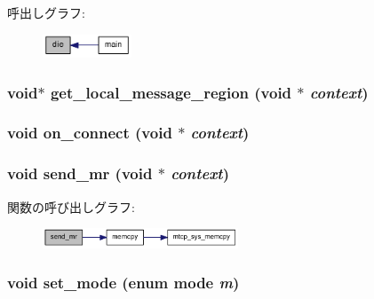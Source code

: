 呼出しグラフ:\nopagebreak
\begin{figure}[H]
\begin{center}
\leavevmode
\includegraphics[width=75pt]{rdma-common_8h_aac69fbddfabaad6d61082ad9e6f94505_icgraph}
\end{center}
\end{figure}
\hypertarget{rdma-common_8h_a0162804c064e82d210197b0163278f39}{
\subsubsection[{get\_\-local\_\-message\_\-region}]{\setlength{\rightskip}{0pt plus 5cm}void$\ast$ get\_\-local\_\-message\_\-region (void $\ast$ {\em context})}}
\label{rdma-common_8h_a0162804c064e82d210197b0163278f39}
\hypertarget{rdma-common_8h_a302021034f42b123904f59dad3990962}{
\subsubsection[{on\_\-connect}]{\setlength{\rightskip}{0pt plus 5cm}void on\_\-connect (void $\ast$ {\em context})}}
\label{rdma-common_8h_a302021034f42b123904f59dad3990962}
\hypertarget{rdma-common_8h_aa7bbf375e749e0c78b50ff21ad9013f7}{
\subsubsection[{send\_\-mr}]{\setlength{\rightskip}{0pt plus 5cm}void send\_\-mr (void $\ast$ {\em context})}}
\label{rdma-common_8h_aa7bbf375e749e0c78b50ff21ad9013f7}


関数の呼び出しグラフ:\nopagebreak
\begin{figure}[H]
\begin{center}
\leavevmode
\includegraphics[width=165pt]{rdma-common_8h_aa7bbf375e749e0c78b50ff21ad9013f7_cgraph}
\end{center}
\end{figure}
\hypertarget{rdma-common_8h_abe5494f2e0e27dd073dafa13b2f89f5e}{
\subsubsection[{set\_\-mode}]{\setlength{\rightskip}{0pt plus 5cm}void set\_\-mode (enum {\bf mode} {\em m})}}
\label{rdma-common_8h_abe5494f2e0e27dd073dafa13b2f89f5e}


